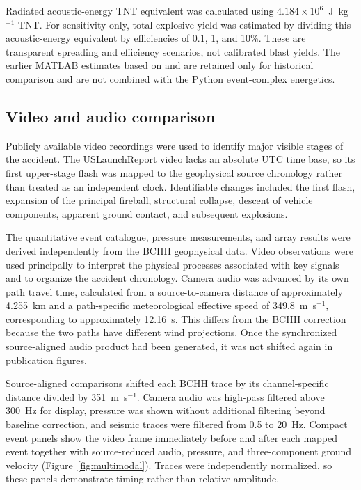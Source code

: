 \documentclass[]{seismica}
\begin{document}
Radiated acoustic-energy TNT equivalent was calculated using
$4.184\times10^6$~J~kg$^{-1}$ TNT. For sensitivity only, total explosive yield
was estimated by dividing this acoustic-energy equivalent by efficiencies of
0.1, 1, and 10\%. These are transparent spreading and efficiency scenarios,
not calibrated blast yields. The earlier MATLAB estimates based on
\citet{johnson_aster_2005} and \citet{kanamori_1977} are retained only for
historical comparison and are not combined with the Python event-complex
energetics.

\subsection{Video and audio comparison}

Publicly available video recordings were used to identify major visible stages
of the accident. The USLaunchReport video lacks an absolute UTC time base, so
its first upper-stage flash was mapped to the geophysical source chronology
rather than treated as an independent clock. Identifiable changes included the
first flash, expansion of the principal fireball, structural collapse, descent
of vehicle components, apparent ground contact, and subsequent explosions.

The quantitative event catalogue, pressure measurements, and array results were
derived independently from the BCHH geophysical data. Video observations were
used principally to interpret the physical processes associated with key
signals and to organize the accident chronology. Camera audio was advanced by
its own path travel time, calculated from a source-to-camera distance of
approximately 4.255~km and a path-specific meteorological effective speed of
349.8~m~s$^{-1}$, corresponding to approximately 12.16~s. This differs from
the BCHH correction because the two paths have different wind projections.
Once the synchronized source-aligned audio product had been generated, it was
not shifted again in publication figures.

Source-aligned comparisons shifted each BCHH trace by its channel-specific
distance divided by 351~m~s$^{-1}$. Camera audio was high-pass filtered above
300~Hz for display, pressure was shown without additional filtering beyond
baseline correction, and seismic traces were filtered from 0.5 to 20~Hz.
Compact event panels show the video frame immediately before and after each
mapped event together with source-reduced audio, pressure, and three-component
ground velocity (Figure~\ref{fig:multimodal}). Traces were independently
normalized, so these panels demonstrate timing rather than relative amplitude.
\end{document}
